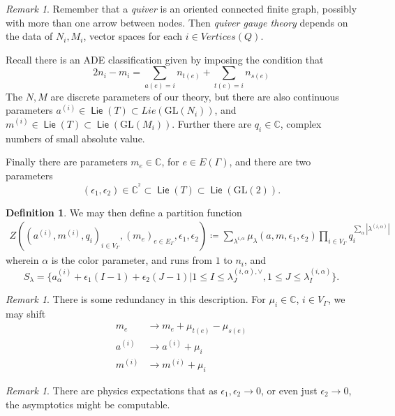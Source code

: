 \documentclass[leqno, openany]{memoir}
\theoremstyle{definition}
\newtheorem{defn}[thm]{Definition}
\theoremstyle{remark}
\newtheorem{rmk}[thm]{Remark}
\theoremstyle{plain}
\theoremstyle{definition}
\theoremstyle{remark}
\newcommand{\mr}[1]{\mathrm{#1}}
\newcommand{\ms}[1]{\mathsf{#1}}
\newcommand{\GL}{\mr{GL}}
\DeclareMathOperator{\Lie}{\ms{Lie}}
\begin{document}
\begin{rmk}
Remember that a \emph{quiver} is an oriented connected finite graph, possibly with more than one arrow between nodes. 
Then \emph{quiver gauge theory} depends on the data of $N_i, M_i$, vector spaces for each $i \in Vertices(Q)$.

Recall there is an ADE classification given by imposing the condition that 
\[
2n_i - m_i = \sum_{a(e) = i} n_{t(e)} + \sum_{t(e) = i} n_{s(e)}
\]
The $N,M$ are discrete parameters of our theory, but there are also 
continuous parameters $a^{(i)} \in \Lie(T) \subset Lie(\GL(N_i))$,
and $m^{(i)} \in \Lie(T) \subset \Lie(\GL(M_i))$. 
Further there are $q_i \in \mathbb{C}$, complex numbers of small absolute value.

Finally there are parameters $m_e \in \mathbb{C}$, for $e \in E(\Gamma)$, and there are two parameters
\[
(\epsilon_1,\epsilon_2)\in \mathbb{C}^^2 \subset \Lie(T) \subset \Lie(\GL(2)).
\]
\end{rmk}

\begin{defn}
We may then define a partition function 
\begin{align*}
Z((a^{(i)},m^{(i)}, q_i)_{i \in V_\Gamma}, (m_e)_{e \in E_\Gamma},\epsilon_1,\epsilon_2) \coloneqq \sum_{\lambda^{i,\alpha}} \mu_\lambda(a,m,\epsilon_1,\epsilon_2) \prod_{i \in V_\Gamma} q_i^{\sum_\alpha |\lambda^{(i,\alpha)}|}
\end{align*}
wherein $\alpha$ is the color parameter, and runs from $1$ to $n_i$,
and 
\[
S_{\lambda} = \{ a_\alpha^{(i)} + \epsilon_1(I -1) + \epsilon_2(J-1) | 1 \leq I \leq \lambda_J^{(i,\alpha),\vee}, 1 \leq J \leq \lambda_I^{(i,\alpha)}\}.
\]
\end{defn}

\begin{rmk}
There is some redundancy in this description. For $\mu_i \in \mathbb{C}$, $i \in V_\Gamma$, we may shift
\begin{align*}
    m_e &\to m_e + \mu_{t(e)} - \mu_{s(e)}
\\
    a^{(i)} &\to a^{(i)} + \mu_i
\\
    m^{(i)} &\to m^{(i)} + \mu_i 
\end{align*}
\end{rmk}

\begin{rmk}
There are physics expectations that as $\epsilon_1,\epsilon_2 \to 0$, or even just $\epsilon_2 \to 0$, the asymptotics might be computable.
\end{rmk}
\end{document}
